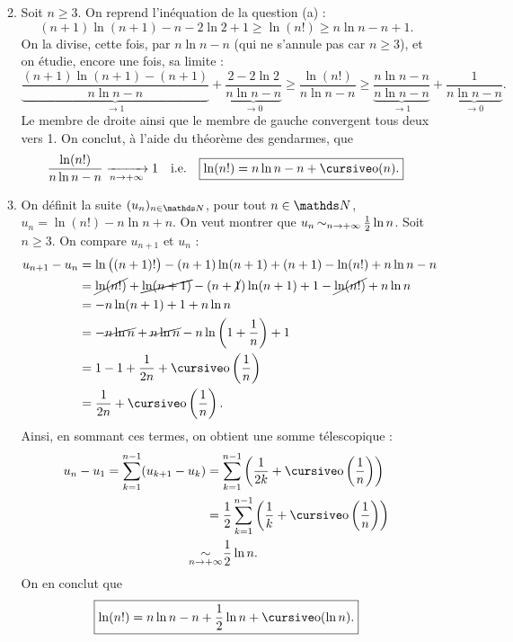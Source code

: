 \documentclass[a4paper]{article}
\begin{document}
\begin{enumerate}
\begin{enumerate}
\[					\]
				\item Soit $n \ge 3$. On reprend l'inéquation de la question (a) : \[
						(n+1) \ln(n+1) - n - 2 \ln 2 + 1 \ge \ln(n!) \ge n \ln n - n+ 1
					.\]
					On la divise, cette fois, par $n \ln n - n$\/ (qui ne s'annule pas car $n \ge 3$), et on étudie, encore une fois, sa limite :
					\[
						\underbrace{\frac{(n+1) \ln(n+1) - (n + 1)}{n \ln n - n}}_{\to 1} + \underbrace{\frac{2 - 2 \ln 2}{n \ln n - n}}_{\to 0} \ge \frac{\ln (n!)}{n \ln n - n} \ge \underbrace{\frac{n \ln n - n}{n \ln n - n}}_{\to 1} + \underbrace{\frac{1}{n \ln n - n}}_{\to 0}
					.\] Le membre de droite ainsi que le membre de gauche convergent tous deux vers 1. On conclut, à l'aide du théorème des gendarmes, que \[
						\frac{\ln(n!)}{n \ln n - n} \tendsto{n\to +\infty} 1\quad\text{i.e.}\quad \boxed{\ln (n!) = n \ln n - n + \po(n).}
					\]
				\item On définit la suite $(u_n)_{n\in\N}$, pour tout $n \in \N$, $u_n = \ln (n!) - n \ln n + n$. On veut montrer que $u_n \operatorname*{\sim}_{n\to +\infty} \frac{1}{2} \ln n$. Soit $n \ge 3$. On compare $u_{n+1}$\/ et $u_n$\/ :
					\begin{align*}
						u_{n+1} - u_n &= \ln\big((n+1)!\big) - (n+1)\ln(n+1) + (n+1) - \ln(n!) + n \ln n - n \\
						&= \cancel{\ln(n!)} + \cancel{\ln(n+1)} - (n+\cancel1)\ln(n+1) + 1 - \cancel{\ln(n!)} + n \ln n \\
						&= -n \ln (n+1) + 1 + n \ln n \\
						&= -\cancel{n \ln n} + \cancel{n \ln n} - n \ln\left( 1 + \frac{1}{n} \right) + 1 \\
						&= 1 - 1 + \frac{1}{2n} + \po\left( \frac{1}{n} \right) \\
						&= \frac{1}{2n} + \po\left( \frac{1}{n} \right). \\
					\end{align*}
					Ainsi, en sommant ces termes, on obtient une somme télescopique :
					\begin{align*}
						u_n - u_1 = \sum_{k=1}^{n-1} (u_{k+1} - u_k) &= \sum_{k=1}^{n-1} \left( \frac{1}{2k} + \po\left( \frac{1}{n} \right) \right)\\
						&= \frac{1}{2} \sum_{k=1}^{n-1} \left(\frac{1}{k} + \po\left( \frac{1}{n} \right)\right)\\
						\simi_{n\to +\infty}\!\!\!\!\!\!\!\!&\mathrel{\phantom{=}} \frac{1}{2} \ln n.
					\end{align*}
					On en conclut que \[
						\boxed{\ln (n!) = n \ln n - n + \frac{1}{2} \ln n + \po(\ln n).}
\]
\end{enumerate}
\end{enumerate}
\end{document}
